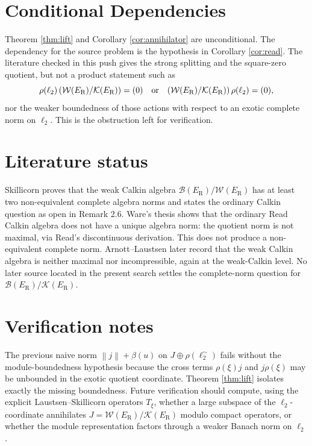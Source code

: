 \documentclass[11pt]{article}
\newcommand{\B}{\mathcal B}
\newcommand{\K}{\mathcal K}
\newcommand{\W}{\mathcal W}
\newcommand{\ER}{E_{\mathrm R}}
\newcommand{\norm}[1]{\left\lVert #1\right\rVert}
\begin{document}
\section*{Conditional Dependencies}

Theorem \ref{thm:lift} and Corollary \ref{cor:annihilator} are unconditional.
The dependency for the source problem is the hypothesis in Corollary
\ref{cor:read}.  The literature checked in this push gives the strong splitting
and the square-zero quotient, but not a product statement such as
\[
\rho(\ell_2)\,(\W(\ER)/\K(\ER))=(0)
\quad\hbox{or}\quad
(\W(\ER)/\K(\ER))\,\rho(\ell_2)=(0),
\]
nor the weaker boundedness of those actions with respect to an exotic complete
norm on \(\ell_2\).  This is the obstruction left for verification.

\section*{Literature status}

Skillicorn proves that the weak Calkin algebra
\(\B(\ER)/\W(\ER)\) has at least two non-equivalent complete algebra norms
and states the ordinary Calkin question as open in Remark 2.6.  Ware's thesis
shows that the ordinary Read Calkin algebra does not have a unique algebra norm:
the quotient norm is not maximal, via Read's discontinuous derivation.  This
does not produce a non-equivalent complete norm.  Arnott--Laustsen later record
that the weak Calkin algebra is neither maximal nor incompressible, again at
the weak-Calkin level.  No later source located in the present search settles
the complete-norm question for \(\B(\ER)/\K(\ER)\).

\section*{Verification notes}

The previous naive norm
\(\norm{j}+\beta(u)\) on \(J\oplus \rho(\ell_2^\sim)\) fails without the
module-boundedness hypothesis because the cross terms
\(\rho(\xi)j\) and \(j\rho(\xi)\) may be unbounded in the exotic quotient
coordinate.  Theorem \ref{thm:lift} isolates exactly the missing boundedness.
Future verification should compute, using the explicit Laustsen--Skillicorn
operators \(T_\xi\), whether a large subspace of the \(\ell_2\)-coordinate
annihilates \(J=\W(\ER)/\K(\ER)\) modulo compact operators, or whether the
module representation factors through a weaker Banach norm on \(\ell_2\).
\end{document}
